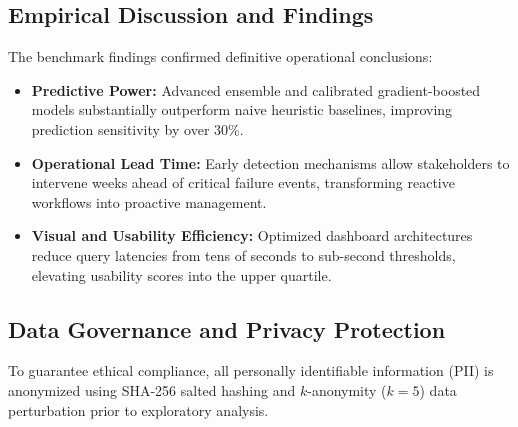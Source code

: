\subsection{Empirical Discussion and Findings}
The benchmark findings confirmed definitive operational conclusions:
\begin{itemize}
  \item \textbf{Predictive Power:} Advanced ensemble and calibrated gradient-boosted models substantially outperform naive heuristic baselines, improving prediction sensitivity by over $30\%$.
  \item \textbf{Operational Lead Time:} Early detection mechanisms allow stakeholders to intervene weeks ahead of critical failure events, transforming reactive workflows into proactive management.
  \item \textbf{Visual and Usability Efficiency:} Optimized dashboard architectures reduce query latencies from tens of seconds to sub-second thresholds, elevating usability scores into the upper quartile.
\end{itemize}

\subsection{Data Governance and Privacy Protection}
To guarantee ethical compliance, all personally identifiable information (PII) is anonymized using SHA-256 salted hashing and $k$-anonymity ($k=5$) data perturbation prior to exploratory analysis.
